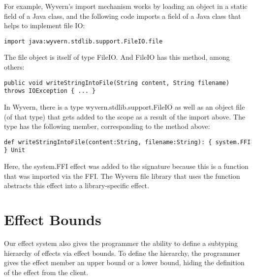For example, Wyvern’s import mechanism works by loading an object in a static field of a Java class, and the following code imports a field of a Java class that helps to implement file IO:\\
\begin{minipage}{\linewidth}
\begin{lstlisting}[xleftmargin=-5pt, numbers=none]
  import java:wyvern.stdlib.support.FileIO.file
\end{lstlisting}
\end{minipage}

The file object is itself of type FileIO. And FileIO has this method, among others: \\
\begin{minipage}{\linewidth}
\begin{lstlisting}[xleftmargin=3pt, numbers=none]
public void writeStringIntoFile(String content, String filename) throws IOException { ... }
\end{lstlisting}
\end{minipage}

In Wyvern, there is a type wyvern.stdlib.support.FileIO as well as an object file (of that type) that gets added to the scope as a result of the import above. The type has the following member, corresponding to the method above: \\
\begin{minipage}{\linewidth}
\begin{lstlisting}[xleftmargin=-5pt, numbers=none]
  def writeStringIntoFile(content:String, filename:String): { system.FFI } Unit 
\end{lstlisting}
\end{minipage}

Here, the system.FFI effect was added to the signature because this is a function that was imported via the FFI. The Wyvern file library that uses the  function abstracts this  effect into a library-specific  effect.



\section{Effect Bounds}

Our effect system also gives the programmer the ability to define a subtyping hierarchy of effects via effect bounds. To define the hierarchy, the programmer gives the effect member an upper bound or a lower bound, hiding the definition of the effect from the client.

